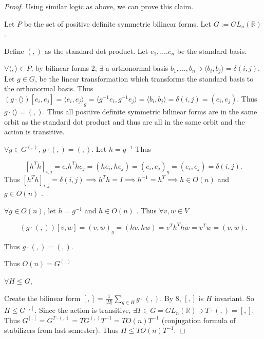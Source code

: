 \documentclass{article}
\newcommand{\R}{\mathbb{R}}
\newcommand{\angles}[1]{{\langle #1 \rangle}}
\begin{document}
\begin{proof}
    Using similar logic as above, we can prove this claim.

    Let $P$ be the set of positive definite symmetric bilinear forms. Let $G := GL_n(\R)$. 

    Define $( , )$ as the standard dot product. Let $e_1, \dots. e_n$ be the standard basis.

    $\forall \angles{ , } \in P$, by bilinear forms 2, $\exists$ a orthonormal basis $b_1, \dots, b_n \ni \angles{b_i, b_j} = \delta(i, j)$. Let $g \in G$, be the linear transformation which transforms the standard basis to the orthonormal basis. Thus $(g \cdot \angles{})[e_i, e_j] = \angles{e_i, e_j}_g = \angles{g^{-1}e_i, g^{-1}e_j} = \angles{b_i, b_j} = \delta(i, j) = (e_i, e_j)$. Thus $g \cdot \angles{} = (,)$. Thus all positive definite symmetric bilinear forms are in the same orbit as the standard dot product and thus are all in the same orbit and the action is transitive.


    $\forall g \in G^{(,)}$, $g \cdot (,) = (,)$. Let $h = g^{-1}$  Thus     

    \[
        [h^Th]_{i,j} = e_i {h}^T h e_j  = (he_i, he_j) = (e_i, e_j)_g = (e_i, e_j) = \delta(i, j).
    \]
    Thus $[h^Th]_{i,j} = \delta(i, j) \implies h^Th = I \implies h^{-1} = h^T \implies h \in O(n)$ and $g \in O(n)$ .

    $\forall g \in O(n)$, let $h = g^{-1}$ and $h \in O(n)$ . Thus $\forall v, w \in V$ 

    \[
        (g \cdot (,))[v, w] = (v, w)_g = (hv, hw) = v^T h^T hw = v^T w = (v, w).
    \]

    Thus $g \cdot (,) = (,)$. 
    
    Thus $O(n) = G^{(,)}$

    $\forall H \leq G$, 
    
    Create the bilinear form $[ , ] = \frac{1}{|H|} \sum_{g \in H} g \cdot ( , )$. By 8, $[ , ]$ is $H$ invariant. So $H \leq G^{[ , ]}$. Since the action is transitive, $\exists T \in G = GL_n(\R) \ni T \cdot (, ) =[ , ]$. Thus $G^{[ , ]} = G^{T \cdot (, )} = T G^{(,)} T^{-1} = T O(n) T^{-1}$ (conjugation formula of stabilizers from last semester). Thus $H \leq T O(n) T^{-1}$.
\end{proof}
\end{document}
